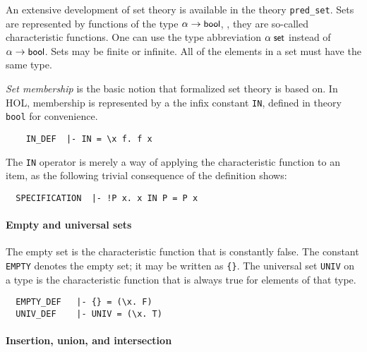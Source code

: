 An extensive development of set theory is available in the theory
{\small\verb+pred_set+}. Sets are represented by functions of the type
$\alpha \to \mbox{\small{\textbf{\sf{bool}}}}$, \ie, they are so-called characteristic
functions. One can use the type abbreviation $\alpha\; \mbox{\small{\textbf{\sf{set}}}}$
instead of $\alpha \to \mbox{\small{\textbf{\sf{bool}}}}$. Sets may be finite or
infinite. All of the elements in a set must have the same type.

\emph{Set membership} is the basic notion that formalized set theory
is based on. In HOL, membership is represented by a the infix constant
{\small\verb+IN+}, defined in theory {\small\verb+bool+} for
convenience.
%
{\small
\begin{verbatim}
    IN_DEF  |- IN = \x f. f x
\end{verbatim}}
%
The {\small\verb+IN+} operator is merely a way of applying the
characteristic function to an item, as the following
trivial consequence of the definition shows:
%
{\small
\begin{verbatim}
  SPECIFICATION  |- !P x. x IN P = P x
\end{verbatim}}
%
\paragraph{Empty and universal sets}

The empty set is the characteristic function that is constantly
false. The constant {\small\verb+EMPTY+} denotes the empty set; it may
be written as {\small\verb+{}+}. The universal set {\small\verb+UNIV+}
on a type is the characteristic function that is always true for
elements of that type.
%
{\small
\begin{verbatim}
  EMPTY_DEF   |- {} = (\x. F)
  UNIV_DEF    |- UNIV = (\x. T)
\end{verbatim}}
%
\paragraph{Insertion, union, and intersection}

